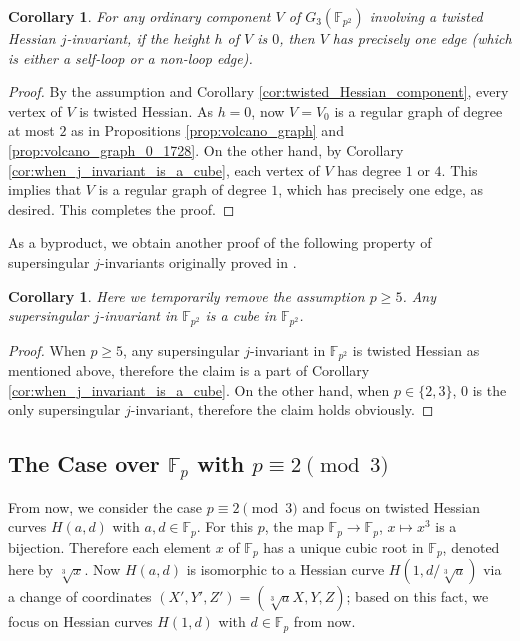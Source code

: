 \documentclass{article}
\newtheorem{corollary}[theorem]{Corollary}
\theoremstyle{definition}
\newcommand{\FF}{\mathbb{F}}
\begin{document}
\begin{corollary}
\label{cor:no_ordinary_isolated_cycle}
For any ordinary component $V$ of $G_3(\FF_{p^2})$ involving a twisted Hessian $j$-invariant, if the height $h$ of $V$ is $0$, then $V$ has precisely one edge (which is either a self-loop or a non-loop edge).
\end{corollary}
\begin{proof}
By the assumption and Corollary \ref{cor:twisted_Hessian_component}, every vertex of $V$ is twisted Hessian.
As $h = 0$, now $V = V_0$ is a regular graph of degree at most $2$ as in Propositions \ref{prop:volcano_graph} and \ref{prop:volcano_graph_0_1728}.
On the other hand, by Corollary \ref{cor:when_j_invariant_is_a_cube}, each vertex of $V$ has degree $1$ or $4$.
This implies that $V$ is a regular graph of degree $1$, which has precisely one edge, as desired.
This completes the proof.
\end{proof}

As a byproduct, we obtain another proof of the following property of supersingular $j$-invariants originally proved in \cite[Theorem 1.2]{morton2011cubic}.

\begin{corollary}
\label{cor:SS_j_invariant_is_cubic}
Here we temporarily remove the assumption $p \geq 5$.
Any supersingular $j$-invariant in $\FF_{p^2}$ is a cube in $\FF_{p^2}$.
\end{corollary}
\begin{proof}
When $p \geq 5$, any supersingular $j$-invariant in $\FF_{p^2}$ is twisted Hessian as mentioned above, therefore the claim is a part of Corollary \ref{cor:when_j_invariant_is_a_cube}.
On the other hand, when $p \in \{2,3\}$, $0$ is the only supersingular $j$-invariant, therefore the claim holds obviously.
\end{proof}


\subsection{The Case over $\FF_p$ with $p \equiv 2 \pmod{3}$}
\label{sec:3-isogeny_walk:2_mod_3}

From now, we consider the case $p \equiv 2 \pmod{3}$ and focus on twisted Hessian curves $H(a,d)$ with $a,d \in \FF_p$.
For this $p$, the map $\FF_p \to \FF_p$, $x \mapsto x^3$ is a bijection.
Therefore each element $x$ of $\FF_p$ has a unique cubic root in $\FF_p$, denoted here by $\sqrt[3]{x}$.
Now $H(a,d)$ is isomorphic to a Hessian curve $H(1,d/\sqrt[3]{a})$ via a change of coordinates $(X',Y',Z') = (\sqrt[3]{a}X,Y,Z)$; based on this fact, we focus on Hessian curves $H(1,d)$ with $d \in \FF_p$ from now.
\end{document}
